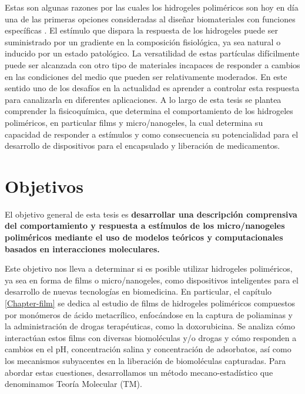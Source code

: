 Estas son algunas razones por las cuales los hidrogeles polim\'ericos son hoy en d\'ia una de las primeras opciones consideradas al dise\~nar biomateriales con funciones espec\'ificas \cite{soni2016nanogels,sabir2019polymeric}. El est\'imulo que dispara la respuesta de los hidrogeles puede ser suministrado por un gradiente en la composici\'on fisiol\'ogica, ya sea natural o inducido por un estado patol\'ogico. La versatilidad de estas part\'iculas dif\'icilmente puede ser alcanzada con otro tipo de materiales incapaces de responder a cambios en las condiciones del medio que pueden ser relativamente moderados.
En este sentido uno de los desaf\'ios en la actualidad es aprender a controlar esta respuesta para canalizarla en diferentes aplicaciones. A lo largo de esta tesis se plantea comprender la fisicoqu\'imica, que determina el comportamiento de los hidrogeles polim\'ericos, en particular  films y micro/nanogeles, la cual determina su capacidad de responder a est\'imulos y como consecuencia su potencialidad para el desarrollo de dispositivos para el encapsulado y liberaci\'on de medicamentos.







\section{Objetivos}

El objetivo general de esta tesis es \textbf{desarrollar una descripci\'on comprensiva del comportamiento y respuesta a est\'imulos de los micro/nanogeles polim\'ericos mediante el uso de modelos te\'oricos y computacionales basados en interacciones moleculares.}

Este objetivo nos lleva a determinar si es posible utilizar hidrogeles polim\'ericos, ya sea en forma de films o micro/nanogeles, como dispositivos inteligentes para el desarrollo de nuevas tecnolog\'ias en biomedicina. En particular, el cap\'itulo \ref{Chapter-film} se dedica al estudio de films de hidrogeles polim\'ericos compuestos por mon\'omeros de \'acido metacr\'ilico, enfoc\'andose en la captura de poliaminas y la administraci\'on de drogas terap\'euticas, como la doxorubicina. Se analiza c\'omo interact\'uan estos films con diversas biomol\'eculas y/o drogas y c\'omo responden a cambios en el pH, concentraci\'on salina y concentraci\'on de adsorbatos, as\'i como los mecanismos subyacentes en la liberaci\'on de biomol\'eculas capturadas.
Para abordar estas cuestiones, desarrollamos un m\'etodo mecano-estad\'istico que denominamos Teor\'ia Molecular (TM).

